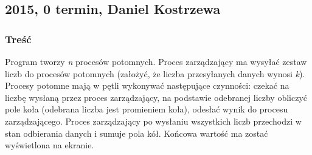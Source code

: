 	\subsection{2015, 0 termin, Daniel Kostrzewa}
		\subsubsection{Treść}
			Program tworzy \textit{n} procesów potomnych. Proces zarządzający ma wysyłać zestaw liczb do procesów potomnych (założyć, że liczba przesyłanych danych wynosi \textit{k}).
			Procesy potomne mają w pętli wykonywać następujące czynności: czekać na liczbę wysłaną przez proces zarządzający, na podstawie odebranej liczby obliczyć pole koła (odebrana liczba jest promieniem koła), odesłać wynik do procesu zarządzającego.
			Proces zarządzający po wysłaniu wszystkich liczb przechodzi w stan odbierania danych i sumuje pola kół. Końcowa wartość ma zostać wyświetlona na ekranie.
